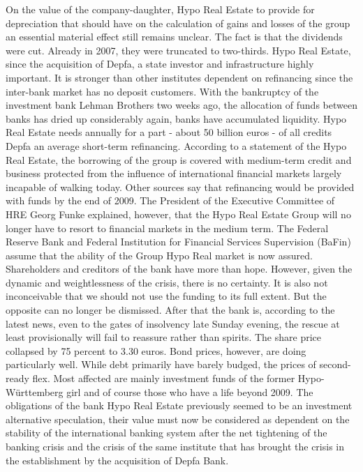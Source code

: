 On the value of the company-daughter, Hypo Real Estate to provide for depreciation that should have on the calculation of gains and losses of the group an essential material effect still remains unclear.
The fact is that the dividends were cut.
Already in 2007, they were truncated to two-thirds.
Hypo Real Estate, since the acquisition of Depfa, a state investor and infrastructure highly important.
It is stronger than other institutes dependent on refinancing since the inter-bank market has no deposit customers.
With the bankruptcy of the investment bank Lehman Brothers two weeks ago, the allocation of funds between banks has dried up considerably again, banks have accumulated liquidity.
Hypo Real Estate needs annually for a part - about 50 billion euros - of all credits Depfa an average short-term refinancing.
According to a statement of the Hypo Real Estate, the borrowing of the group is covered with medium-term credit and business protected from the influence of international financial markets largely incapable of walking today.
Other sources say that refinancing would be provided with funds by the end of 2009.
The President of the Executive Committee of HRE Georg Funke explained, however, that the Hypo Real Estate Group will no longer have to resort to financial markets in the medium term.
The Federal Reserve Bank and Federal Institution for Financial Services Supervision (BaFin) assume that the ability of the Group Hypo Real market is now assured.
Shareholders and creditors of the bank have more than hope.
However, given the dynamic and weightlessness of the crisis, there is no certainty.
It is also not inconceivable that we should not use the funding to its full extent.
But the opposite can no longer be dismissed.
After that the bank is, according to the latest news, even to the gates of insolvency late Sunday evening, the rescue at least provisionally will fail to reassure rather than spirits.
The share price collapsed by 75 percent to 3.30 euros.
Bond prices, however, are doing particularly well.
While debt primarily have barely budged, the prices of second-ready flex.
Most affected are mainly investment funds of the former Hypo-Württemberg girl and of course those who have a life beyond 2009.
The obligations of the bank Hypo Real Estate previously seemed to be an investment alternative speculation, their value must now be considered as dependent on the stability of the international banking system after the net tightening of the banking crisis and the crisis of the same institute that has brought the crisis in the establishment by the acquisition of Depfa Bank.
